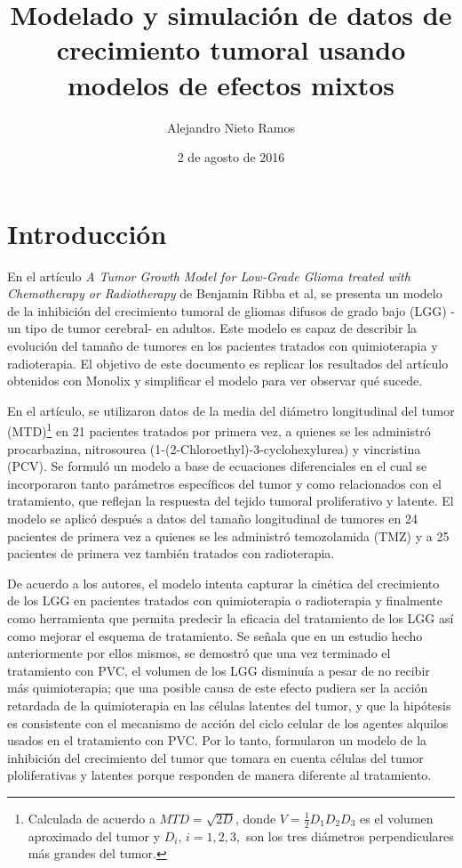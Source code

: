 \documentclass[letterpaper,12pt]{article}
\author{Alejandro Nieto Ramos}
\title{Modelado y simulación de datos de crecimiento tumoral usando modelos de efectos mixtos}
\date{2 de agosto de 2016}
\theoremstyle{definition} \newtheorem{Def}{Definición}[section]
\theoremstyle{definition} \newtheorem{Teo}{Teorema}[section]
\theoremstyle{definition} \newtheorem{Pro}{Proposición}
\theoremstyle{definition} \newtheorem{Lema}{Lema}[section]
\theoremstyle{definition} \newtheorem{Cor}{Corolario}[section]
\begin{document}
\maketitle

\section{Introducción}

En el artículo \emph{A Tumor Growth Model for Low-Grade Glioma treated with Chemotherapy or Radiotherapy} de Benjamin Ribba et al, se presenta un modelo de la inhibición del crecimiento tumoral de gliomas difusos de grado bajo (LGG) -un tipo de tumor cerebral- en adultos. Este modelo es capaz de describir la evolución del tamaño de tumores en los pacientes tratados con quimioterapia y radioterapia. El objetivo de este documento es replicar los resultados del artículo obtenidos con Monolix y simplificar el modelo para ver observar qué sucede.

En el artículo, se utilizaron datos de la media del diámetro longitudinal del tumor (MTD)\footnote{Calculada de acuerdo a $MTD=\sqrt{2D}$, donde $V=\frac{1}{2} D_1 D_2 D_3$ es el volumen aproximado del tumor y $D_i, \, i=1,2,3,$ son los tres diámetros perpendiculares más grandes del tumor.} en 21 pacientes tratados por primera vez, a quienes se les administró  procarbazina, nitrosourea (1-(2-Chloroethyl)-3-cyclohexylurea) y vincristina (PCV). Se formuló un modelo a base de ecuaciones diferenciales en el cual se incorporaron tanto parámetros específicos del tumor y como relacionados con el tratamiento, que reflejan la respuesta del tejido tumoral proliferativo y latente. El modelo se aplicó después a datos del tamaño longitudinal de tumores en 24 pacientes de primera vez a quienes se les administró temozolamida (TMZ) y a 25 pacientes de primera vez también tratados con radioterapia. 

De acuerdo a los autores, el modelo intenta capturar la cinética del crecimiento de los LGG en pacientes tratados con quimioterapia o radioterapia y finalmente como herramienta que permita predecir la eficacia del tratamiento de los LGG así como mejorar el esquema de tratamiento. Se señala que en un estudio hecho anteriormente por ellos mismos, se demostró que una vez terminado el tratamiento con PVC, el volumen de los LGG disminuía a pesar de no recibir más quimioterapia; que una posible causa de este efecto pudiera ser la acción retardada de la quimioterapia en las células latentes del tumor, y que la hipótesis es consistente con el mecanismo de acción del ciclo celular de los agentes alquilos usados en el tratamiento con PVC. Por lo tanto, formularon un modelo de la inhibición del crecimiento del tumor que tomara en cuenta células del tumor ploliferativas y latentes porque responden de manera diferente al tratamiento. 
\end{document}
